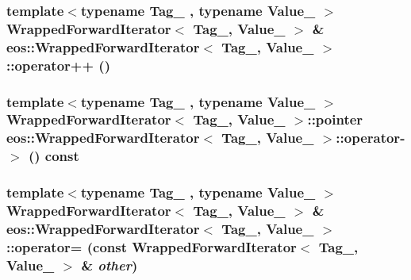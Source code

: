 \label{classeos_1_1WrappedForwardIterator_a34a30fd266a0f1c8610dd0b354c4dd21}
\hypertarget{classeos_1_1WrappedForwardIterator_a553cd24e60c32710a09912f446213833}{
\subsubsection[{operator++}]{\setlength{\rightskip}{0pt plus 5cm}template$<$typename Tag\_\- , typename Value\_\- $>$ {\bf WrappedForwardIterator}$<$ Tag\_\-, Value\_\- $>$ \& {\bf eos::WrappedForwardIterator}$<$ Tag\_\-, Value\_\- $>$::operator++ ()}}
\label{classeos_1_1WrappedForwardIterator_a553cd24e60c32710a09912f446213833}
\hypertarget{classeos_1_1WrappedForwardIterator_af12c608415c6ee323ca93834486fc2b7}{
\subsubsection[{operator-\/$>$}]{\setlength{\rightskip}{0pt plus 5cm}template$<$typename Tag\_\- , typename Value\_\- $>$ {\bf WrappedForwardIterator}$<$ Tag\_\-, Value\_\- $>$::{\bf pointer} {\bf eos::WrappedForwardIterator}$<$ Tag\_\-, Value\_\- $>$::operator-\/$>$ () const}}
\label{classeos_1_1WrappedForwardIterator_af12c608415c6ee323ca93834486fc2b7}
\hypertarget{classeos_1_1WrappedForwardIterator_a73f420f7f9bcc8bf8ad1286f7d5f9601}{
\subsubsection[{operator=}]{\setlength{\rightskip}{0pt plus 5cm}template$<$typename Tag\_\- , typename Value\_\- $>$ {\bf WrappedForwardIterator}$<$ Tag\_\-, Value\_\- $>$ \& {\bf eos::WrappedForwardIterator}$<$ Tag\_\-, Value\_\- $>$::operator= (const {\bf WrappedForwardIterator}$<$ Tag\_\-, Value\_\- $>$ \& {\em other})}}
